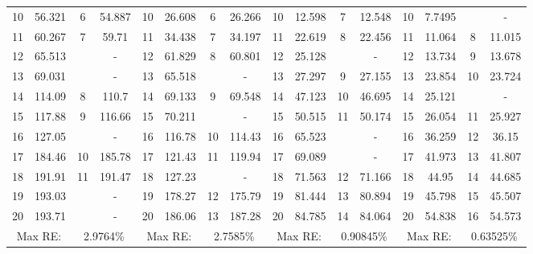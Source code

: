 \documentclass[../../main.tex]{subfiles}
\begin{document}
\begin{table}[htbp]
{{\begin{tabular}{|cccc||cccc||cccc||cccc|}
			10    & 56.321 & 6     & {54.887} & 10    & 26.608 & 6     & 26.266 & 10    & 12.598 & 7     & 12.548 & 10    & 7.7495 &       & {-} \\
			11    & 60.267 & 7     & {59.71} & 11    & 34.438 & 7     & 34.197 & 11    & 22.619 & 8     & 22.456 & 11    & 11.064 & 8     & 11.015 \\
			12    & 65.513 &       & -     & 12    & 61.829 & 8     & 60.801 & 12    & 25.128 &       & {-} & 12    & 13.734 & 9     & 13.678 \\
			13    & 69.031 &       & -     & 13    & 65.518 &       & {-} & 13    & 27.297 & 9     & 27.155 & 13    & 23.854 & 10    & 23.724 \\
			14    & 114.09 & 8     & {110.7} & 14    & 69.133 & 9     & 69.548 & 14    & 47.123 & 10    & 46.695 & 14    & 25.121 &       & {-} \\
			15    & 117.88 & 9     & {116.66} & 15    & 70.211 &       & {-} & 15    & 50.515 & 11    & 50.174 & 15    & 26.054 & 11    & 25.927 \\
			16    & 127.05 &       & -     & 16    & 116.78 & 10    & 114.43 & 16    & 65.523 &       & {-} & 16    & 36.259 & 12    & 36.15 \\
			17    & 184.46 & 10    & {185.78} & 17    & 121.43 & 11    & 119.94 & 17    & 69.089 &       & {-} & 17    & 41.973 & 13    & 41.807 \\
			18    & 191.91 & 11    & {191.47} & 18    & 127.23 &       & {-} & 18    & 71.563 & 12    & 71.166 & 18    & 44.95 & 14    & 44.685 \\
			19    & 193.03 &       & -     & 19    & 178.27 & 12    & 175.79 & 19    & 81.444 & 13    & 80.894 & 19    & 45.798 & 15    & 45.507 \\
			20    & 193.71 &       & -     & 20    & 186.06 & 13    & 187.28 & 20    & 84.785 & 14    & 84.064 & 20    & 54.838 & 16    & 54.573 \\
			\hline
			\multicolumn{2}{|c}{Max RE:} & \multicolumn{2}{c||}{2.9764\%} & \multicolumn{2}{c}{Max RE:} & \multicolumn{2}{c||}{2.7585\%} & \multicolumn{2}{c}{Max RE:} & \multicolumn{2}{c||}{0.90845\%} & \multicolumn{2}{c}{Max RE:} & \multicolumn{2}{c|}{0.63525\%} \\
			\hline
		\end{tabular}%
		\label{tab:Table_plate_1}%
	}}
\end{table}%
\FloatBarrier
\end{document}
